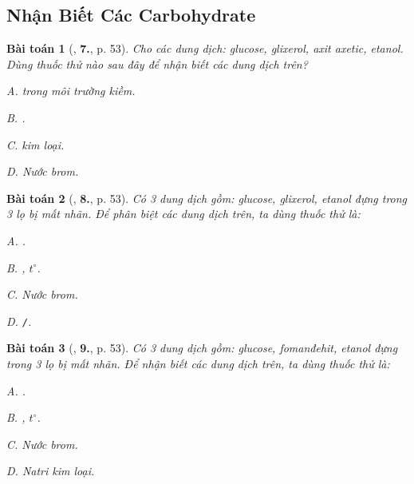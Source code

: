 \documentclass{article}
\numberwithin{equation}{section}
\newtheorem{baitoan}{Bài toán}[section]
\begin{document}

\subsection{Nhận Biết Các Carbohydrate}

\begin{baitoan}[\cite{An2008}, \textbf{7.}, p. 53]
	Cho các dung dịch: glucose, glixerol, axit axetic, etanol. Dùng thuốc thử nào sau đây để nhận biết các dung dịch trên?
	\begin{enumerate*}
		\item[{\rm\sf A.}] \emph{} trong môi trường kiềm.
		\item[{\rm\sf B.}] \emph{}.
		\item[{\rm\sf C.}] \emph{} kim loại.
		\item[{\rm\sf D.}] Nước brom.
	\end{enumerate*}
\end{baitoan}

\begin{baitoan}[\cite{An2008}, \textbf{8.}, p. 53]
	Có 3 dung dịch gồm: glucose, glixerol, etanol đựng trong 3 lọ bị mất nhãn. Để phân biệt các dung dịch trên, ta dùng thuốc thử là:
	\begin{enumerate*}
		\item[{\rm\sf A.}] \emph{\ce{[Ag(NH3)2]OH}}.
		\item[{\rm\sf B.}] \emph{}, $t^\circ$.
		\item[{\rm\sf C.}] Nước brom.
		\item[{\rm\sf D.}] \emph{\texttt{/}\ce{HCl}}.
	\end{enumerate*}
\end{baitoan}

\begin{baitoan}[\cite{An2008}, \textbf{9.}, p. 53]
	Có 3 dung dịch gồm: glucose, fomanđehit, etanol đựng trong 3 lọ bị mất nhãn. Để nhận biết các dung dịch trên, ta dùng thuốc thử là:
	\begin{enumerate*}
		\item[{\rm\sf A.}] \emph{}.
		\item[{\rm\sf B.}] \emph{}, $t^\circ$.
		\item[{\rm\sf C.}] Nước brom.
		\item[{\rm\sf D.}] Natri kim loại.
	\end{enumerate*}
\end{baitoan}
\end{document}
